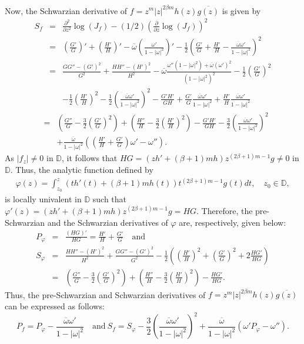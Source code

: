 \documentclass[12pt,reqno]{amsart}
\newtheorem{open problem}{Open problem}[section]
\newcommand{\ol}{\overline}
\newcommand{\be}{\begin{equation}}
\newcommand{\ee}{\end{equation}}
\newcommand{\beas}{\begin{eqnarray*}}
\newcommand{\eeas}{\end{eqnarray*}}
\renewcommand{\phi}{\varphi}
\numberwithin{equation}{section}
\begin{document}
Now, the Schwarzian derivative of $f=z^m |z|^{2\beta m} h(z)\ol{g(z)}$ is given by
 \beas S_f&=&\frac{\partial^2}{\partial z^2}\log(J_f)-(1/2)\left(\frac{\partial}{\partial z}\log(J_f)\right)^2\\
 &=&\left(\frac{G'}{G}\right)'+\left(\frac{H'}{H}\right)'-\ol{\omega}\left(\frac{\omega'}{1-|\omega|^2}\right)'-\frac{1}{2}\left(\frac{G'}{G}+\frac{H'}{H}-\frac{\ol{\omega}\omega'}{1-|\omega|^2}\right)^2\\[2mm]
 &=&\frac{GG''-(G')^2}{G^2}+\frac{HH''-(H')^2}{H^2}-\ol{\omega}\frac{\omega''\left(1-|\omega|^2\right)+\ol{\omega}\left(\omega'\right)^2}{\left(1-|\omega|^2\right)^2}-\frac{1}{2}\left(\frac{G'}{G}\right)^2\\[2mm]
 &&-\frac{1}{2}\left(\frac{H'}{H}\right)^2-\frac{1}{2}\left(\frac{\ol{\omega}\omega'}{1-|\omega|^2}\right)^2-\frac{G'H'}{GH}+\frac{G'}{G}\frac{\ol{\omega}\omega'}{1-|\omega|^2}+\frac{H'}{H}\frac{\ol{\omega}\omega'}{1-|\omega|^2}\eeas
\beas &=&\left(\frac{G''}{G}-\frac{3}{2}\left(\frac{G'}{G}\right)^2\right)+\left(\frac{H''}{H}-\frac{3}{2}\left(\frac{H'}{H}\right)^2\right)-\frac{G'H'}{GH}-\frac{3}{2}\left(\frac{\ol{\omega}\omega'}{1-|\omega|^2}\right)^2\\[2mm]
 &&+\frac{\ol{\omega}}{1-|\omega|^2}\left(\left(\frac{H'}{H}+\frac{G'}{G}\right)\omega'-\omega''\right).\eeas
As $|f_z|\not=0$ in $\mathbb{D}$, it follows that $HG=(zh'+(\beta+1)mh)z^{(2\beta+1)m-1}g\not=0$ in $\mathbb{D}$. Thus, the analytic function defined by 
 \beas \phi(z)=\int_{z_0}^z (t h'(t)+(\beta+1)m h(t))t^{(2\beta+1)m-1}g(t) dt, \quad z_0\in\mathbb{D},\eeas
is locally univalent in $\mathbb{D}$ such that $\phi'(z)=(zh'+(\beta+1)m h)z^{(2\beta+1)m-1}g=HG$.
Therefore, the pre-Schwarzian and the Schwarzian derivatives of $\phi$ are, respectively, given below:
\beas P_\phi&=&\frac{(HG)'}{HG}=\frac{H'}{H}+\frac{G'}{G}\quad\text{and}\\[2mm]
S_\phi&=&\frac{HH''-(H')^2}{H^2}+\frac{GG''-(G')^2}{G^2}-\frac{1}{2}\left(\left(\frac{H'}{H}\right)^2+\left(\frac{G'}{G}\right)^2+2\frac{HG'}{HG}\right)\\[2mm]
&=&\left(\frac{G''}{G}-\frac{3}{2}\left(\frac{G'}{G}\right)^2\right)+\left(\frac{H''}{H}-\frac{3}{2}\left(\frac{H'}{H}\right)^2\right)-\frac{HG'}{HG}.\eeas
Thus, the pre-Schwarzian and Schwarzian derivatives of $f=z^m |z|^{2\beta m} h(z)\ol{g(z)}$ can be expressed as follows:
\be\label{c4}P_f=P_\phi-\frac{\ol{\omega}\omega'}{1-|\omega|^2}\quad\text{and}~ S_f=S_\phi-\frac{3}{2}\left(\frac{\ol{\omega}\omega'}{1-|\omega|^2}\right)^2+\frac{\ol{\omega}}{1-|\omega|^2}\left(\omega' P_\phi-\omega''\right).\ee
\end{document}
